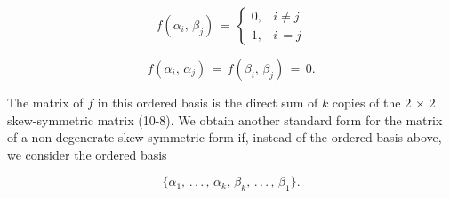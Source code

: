 \[f(\alpha_{i},\,\beta_{j})\,=\,\begin{cases}0,&i\neq j\\ 1,&i\,=j\end{cases}\]

\[f(\alpha_{i},\,\alpha_{j})\,=\,f(\beta_{i},\,\beta_{j})\,=\,0.\]

The matrix of \(f\) in this ordered basis is the direct sum of \(k\) copies of the \(2\,\times\,2\) skew-symmetric matrix (10-8). We obtain another standard form for the matrix of a non-degenerate skew-symmetric form if, instead of the ordered basis above, we consider the ordered basis

\[\{\alpha_{1},\,.\,.\,.\,,\,\alpha_{k},\,\beta_{k},\,.\,.\,.\,,\,\beta_{1}\}.\] 